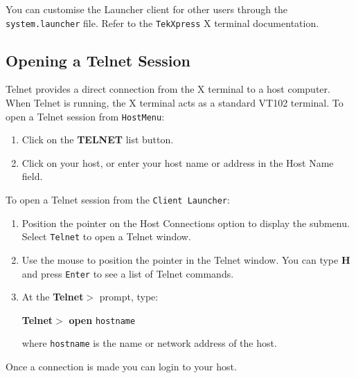 \documentclass[11pt]{article}
\begin{document}
You can customise the Launcher client for other users through the
{\tt system.launcher} file. Refer to the {\tt TekXpress} X terminal
documentation.

\clearpage

\subsection {Opening a Telnet Session}

Telnet provides a direct connection from the X terminal to a host computer.
When Telnet is running, the X terminal acts as a standard VT102 terminal. To
open a Telnet session from {\tt HostMenu}:

\begin {enumerate}

\item Click on the {\bf TELNET} list button.

\item Click on your host, or enter your host name or address in the Host Name
field.

\end {enumerate}

To open a Telnet session from the {\tt Client Launcher}:

\begin {enumerate}

\item Position the pointer on the Host Connections option to display the
submenu. Select {\tt Telnet} to open a Telnet window.

\item Use the mouse to position the pointer in the Telnet window. You can type
{\bf H} and press {\tt Enter} to see a list of Telnet commands.

\item At the {\bf Telnet$>$} prompt, type:

{\bf Telnet$>$} {\bf open} {\tt hostname}

where {\tt hostname} is the name or network address of the host.

\end {enumerate}

Once a connection is made you can login to your host.
\end{document}
